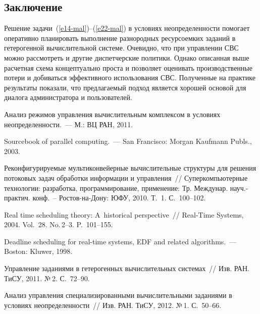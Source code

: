 \begin{multicols}{2}
\section*{Заключение}

Решение задачи~(\ref{e14-mal})--(\ref{e22-mal}) в условиях неопределенности помогает
оперативно планировать выполнение разнородных ресурсоемких заданий в
гетерогенной вычислительной системе. Очевидно, что при управлении
СВС можно рассмотреть и другие диспетчерские политики. Однако
описанная выше расчетная схема концептуально проста и позволяет
оценивать производственные потери и добиваться эффективного
использования СВС. Полученные на практике результаты показали, что
предлагаемый подход является хорошей основой для диалога
администратора и пользователей.

{\small\frenchspacing
{%
\begin{thebibliography}{99}

Анализ режимов управления вычислительным комплексом в условиях неопределенности.~--- М.: ВЦ РАН, 2011.

{Sourcebook of parallel computing}.~--- San Francisco: Morgan Kaufmann Publs., 2003.

  
Реконфигурируемые мультиконвейерные вычислительные структуры для решения потоковых 
задач обработки информации и управления~//  Суперкомпьютерные технологии: разработка, программирование, 
применение: Тр. Междунар. науч.-практич. конф.~-- Ростов-на-Дону: ЮФУ, 2010. Т.~1. С.~100--102.

  
Real time scheduling theory: A~historical perspective~//  Real-Time Systems, 2004. Vol.~28.  No.\,2--3. P.~101--155.

  
Deadline scheduling for real-time systems, EDF and related algorithms.~--- Boston: Kluwer,  1998.

  
Управление заданиями в гетерогенных вычислительных системах~// Изв. РАН. ТиСУ, 2011. №\,2. С.~72--90.

  
Анализ управления  специализированными вычислительными заданиями в условиях неопределенности~// 
Изв. РАН. ТиСУ, 2012. №\,1. С.~50--66.


\end{thebibliography}}}
\end{multicols}
